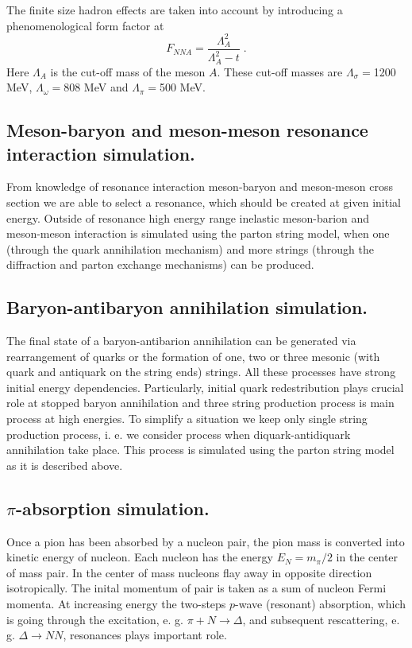 The finite size hadron effects  
are taken into account by introducing 
a phenomenological form factor at
\begin{equation}
\label{HCS2}
F_{NNA} = \frac{\Lambda_A^2}{\Lambda_A^2-t} \; .
\end{equation}
Here $\Lambda_A$ is the cut-off mass of the meson $A$. These cut-off masses are
$\Lambda_{\sigma}=$1200 MeV, $\Lambda_{\omega}=$808 MeV and 
$\Lambda_{\pi}=$500 MeV. \\

\subsection{Meson-baryon and meson-meson resonance interaction 
simulation.}

\hspace{1.0em}From knowledge of resonance interaction meson-baryon and 
meson-meson cross section we are able to select a resonance, which 
should be created at given initial energy. Outside of resonance high 
energy range inelastic meson-barion and meson-meson interaction is simulated 
using the parton string model, when one (through the quark annihilation 
mechanism) and more strings (through the diffraction and parton exchange 
mechanisms) can be produced.

\subsection{Baryon-antibaryon annihilation simulation.}

\hspace{1.0em} The final state of a baryon-antibarion annihilation can 
be generated via rearrangement of quarks or the formation of one, two 
or three mesonic (with quark and antiquark on the string ends) strings. 
All these processes have strong initial energy dependencies. 
Particularly, initial quark redestribution plays crucial role at stopped 
baryon annihilation and three string production process is main 
process at high energies. 
To simplify a situation we keep only single string production process, 
i. e. we consider process when diquark-antidiquark annihilation 
take place. This process is simulated using the parton string 
model as it is described above.

\subsection{$\pi$-absorption simulation.}

\hspace{1.0em}
Once a pion has been absorbed by a nucleon pair, the pion mass is converted
into kinetic energy of nucleon. Each nucleon has the energy $E_N = m_{\pi}/2$ 
in the center of mass pair. In the center of mass nucleons flay away in
opposite direction isotropically.
The inital momentum of pair is taken as a sum of nucleon Fermi momenta.
 At increasing energy 
 the  
two-steps $p$-wave (resonant) absorption, which is
 going through the excitation, e. g. $\pi + N
\rightarrow \Delta$, and subsequent rescattering, e. g. $\Delta \rightarrow N
N$, resonances plays important role.
